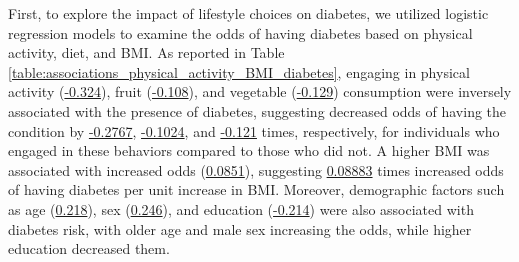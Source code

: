 \documentclass[11pt]{article}
\begin{document}
First, to explore the impact of lifestyle choices on diabetes, we utilized logistic regression models to examine the odds of having diabetes based on physical activity, diet, and BMI. As reported in Table \ref{table:associations_physical_activity_BMI_diabetes}, engaging in physical activity (\hyperlink{A2a}{-0.324}), fruit (\hyperlink{A3a}{-0.108}), and vegetable (\hyperlink{A4a}{-0.129}) consumption were inversely associated with the presence of diabetes, suggesting decreased odds of having the condition by \hyperlink{results0}{-0.2767}, \hyperlink{results1}{-0.1024}, and \hyperlink{results2}{-0.121} times, respectively, for individuals who engaged in these behaviors compared to those who did not. A higher BMI was associated with increased odds (\hyperlink{A5a}{0.0851}), suggesting \hyperlink{results3}{0.08883} times increased odds of having diabetes per unit increase in BMI. Moreover, demographic factors such as age (\hyperlink{A6a}{0.218}), sex (\hyperlink{A7a}{0.246}), and education (\hyperlink{A8a}{-0.214}) were also associated with diabetes risk, with older age and male sex increasing the odds, while higher education decreased them.
\end{document}
